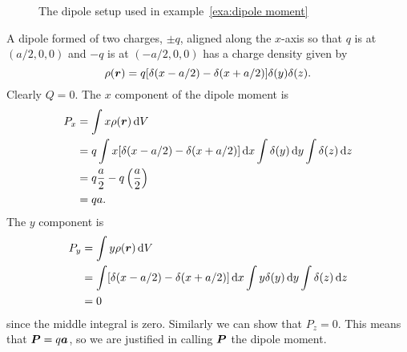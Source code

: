     \begin{example}\label{exa:dipole moment}
        \begin{figure}[ht]
            \centering
            \caption{The dipole setup used in example~\ref{exa:dipole moment}}
        \end{figure}
        A dipole formed of two charges, \(\pm q\), aligned along the \(x\)-axis so that \(q\) is at \((a/2, 0, 0)\) and \(-q\) is at \((-a/2, 0, 0)\) has a charge density given by
        \[\rho(\bm{r}) = q[\delta(x - a/2) - \delta(x + a/2)]\delta(y)\delta(z).\]
        Clearly \(Q = 0\).
        The \(x\) component of the dipole moment is
        \begin{align*}
            P_x &= \int x\rho(\bm{r})\dd{V}\\
            &= q\int x[\delta(x - a/2) - \delta(x + a/2)]\dd{x}\int\delta(y)\dd{y}\int\delta(z)\dd{z}\\
            &= q\frac{a}{2} - q\left(\frac{a}{2}\right)\\
            &= qa.
        \end{align*}
        The \(y\) component is
        \begin{align*}
            P_y &= \int y\rho(\bm{r})\dd{V}\\
            &= \int[\delta(x - a/2) - \delta(x + a/2)]\dd{x}\int y\delta(y)\dd{y}\int \delta(z)\dd{z}\\
            &= 0
        \end{align*}
        since the middle integral is zero.
        Similarly we can show that \(P_z = 0\).
        This means that \(\bm{P} = q\bm{a}\), so we are justified in calling \(\bm{P}\) the dipole moment.
    \end{example}

